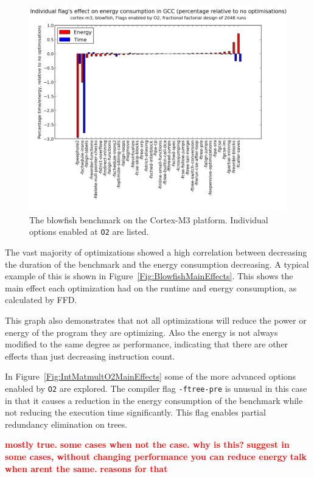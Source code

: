 \documentclass[twocolumn]{article}
\newcommand{\todo}[1]{\textbf{\textcolor{red}{#1}}}
\begin{document}
\begin{figure}
	\includegraphics[width=\linewidth]{cortex-m3/O2_main_effects_blowfish.png}
	\caption{The blowfish benchmark on the Cortex-M3 platform. Individual options enabled at \texttt{O2} are listed.}
	\label{Fig:BlowfishO2MainEffects}
\end{figure}

The vast majority of optimizations showed a high correlation between decreasing the duration of the benchmark and the energy consumption decreasing. A typical example of this is shown in Figure~\ref{Fig:BlowfishMainEffects}. This shows the main effect each optimization had on the runtime and energy consumption, as calculated by FFD.

This graph also demonstrates that not all optimizations will reduce the power or energy of the program they are optimizing. Also the energy is not always modified to the same degree as performance, indicating that there are other effects than just decreasing instruction count.

In Figure~\ref{Fig:IntMatmultO2MainEffects} some of the more advanced options enabled by \texttt{O2} are explored. The compiler flag \texttt{-ftree-pre} is unusual in this case in that it causes a reduction in the energy consumption of the benchmark while not reducing the execution time significantly. This flag enables partial redundancy elimination on trees.


\todo{mostly true.}
\todo{some cases when not the case. why is this?}
\todo{suggest in some cases, without changing performance you can reduce energy}
\todo{talk when arent the same.}
\todo{reasons for that}
\end{document}
